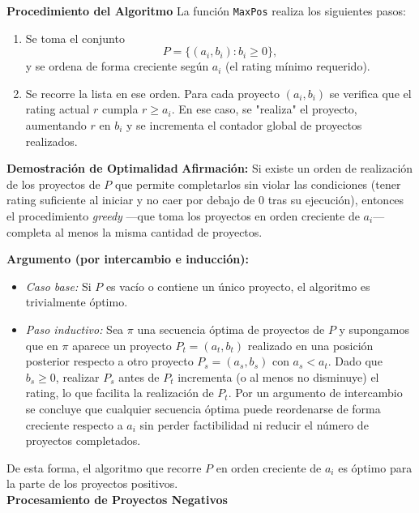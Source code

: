﻿\documentclass{article}
\theoremstyle{plain}
\theoremstyle{definition}
\begin{document}
\textbf{Procedimiento del Algoritmo}
La función \texttt{MaxPos} realiza los siguientes pasos:
\begin{enumerate}[label=\alph*)]
    \item Se toma el conjunto
    \[
    P = \{ (a_i, b_i) : b_i \ge 0 \},
    \]
    y se ordena de forma creciente según $a_i$ (el rating mínimo requerido).
    
    \item Se recorre la lista en ese orden. Para cada proyecto $(a_i, b_i)$ se verifica que el rating actual $r$ cumpla $r \ge a_i$. En ese caso, se "realiza" el proyecto, aumentando $r$ en $b_i$ y se incrementa el contador global de proyectos realizados.
\end{enumerate}

\textbf{Demostración de Optimalidad}
\textbf{Afirmación:} Si existe un orden de realización de los proyectos de $P$ que permite completarlos sin violar las condiciones (tener rating suficiente al iniciar y no caer por debajo de 0 tras su ejecución), entonces el procedimiento \emph{greedy} ---que toma los proyectos en orden creciente de $a_i$--- completa al menos la misma cantidad de proyectos.

\medskip
\noindent \textbf{Argumento (por intercambio e inducción):}
\begin{itemize}
    \item \emph{Caso base:} Si $P$ es vacío o contiene un único proyecto, el algoritmo es trivialmente óptimo.
    \item \emph{Paso inductivo:} Sea $\pi$ una secuencia óptima de proyectos de $P$ y supongamos que en $\pi$ aparece un proyecto $P_t = (a_t, b_t)$ realizado en una posición posterior respecto a otro proyecto $P_s = (a_s, b_s)$ con $a_s < a_t$. Dado que $b_s \ge 0$, realizar $P_s$ antes de $P_t$ incrementa (o al menos no disminuye) el rating, lo que facilita la realización de $P_t$. Por un argumento de intercambio se concluye que cualquier secuencia óptima puede reordenarse de forma creciente respecto a $a_i$ sin perder factibilidad ni reducir el número de proyectos completados.
\end{itemize}
De esta forma, el algoritmo que recorre $P$ en orden creciente de $a_i$ es óptimo para la parte de los proyectos positivos.
\\

\textbf{Procesamiento de Proyectos Negativos}
\\
\end{document}
